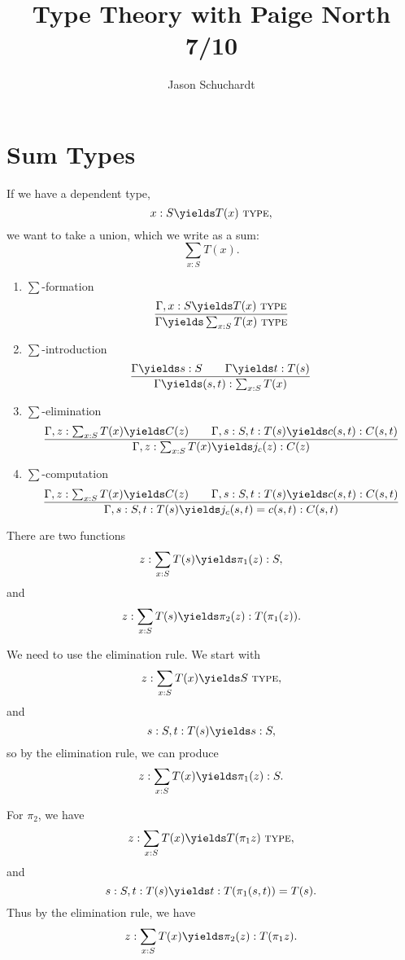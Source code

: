 \documentclass{article}
\title{Type Theory with Paige North 7/10}
\author{Jason Schuchardt}
\newcommand\TYPE{\text{ \scshape{type}}}
\begin{document}
\maketitle

\section{Sum Types}

If we have a dependent type,
\[ x:S\yields T(x)\TYPE,\]
we want to take a union, which we write 
as a sum:
\[\sum_{x:S} T(x).\]

\begin{enumerate}
    \item $\sum$-formation
        \[ \frac{\Gamma,x:S\yields T(x)\TYPE}{
            \Gamma\yields \sum_{x:S}T(x)\TYPE
        }\]
    \item $\sum$-introduction
        \[
            \frac{\Gamma\yields s:S\qquad \Gamma \yields t:T(s)}
            {
                \Gamma \yields (s,t) : \sum_{x:S}T(x)
            }
        \]
    \item $\sum$-elimination
        \[
            \frac{
                \Gamma,z:\sum_{x:S}T(x)\yields C(z)
                \qquad
                \Gamma,s:S,t:T(s) \yields c(s,t) : C(s,t)
            }{
                \Gamma,z:\sum_{x:S}T(x)\yields j_c(z):C(z)
            }
        \]
    \item $\sum$-computation
        \[
            \frac{
                \Gamma,z:\sum_{x:S}T(x)\yields C(z)
                \qquad
                \Gamma,s:S,t:T(s) \yields c(s,t) : C(s,t)
            }{
                \Gamma,s:S,t:T(s)\yields j_c(s,t) = c(s,t) :C(s,t)
            }
        \]
\end{enumerate}

\begin{example}
    There are two functions
    \[ z: \sum_{x:S} T(s) \yields \pi_1(z) : S, \]
    and
    \[ z: \sum_{x:S} T(s) \yields \pi_2(z) : T(\pi_1(z)). \]

    We need to use the elimination rule.
    We start with 
    \[ z:\sum_{x:S} T(x) \yields S\TYPE, \]
    and 
    \[ s:S, t:T(s) \yields s:S,\]
    so by the elimination rule, we can produce
    \[ z:\sum_{x:S}T(x)\yields \pi_1(z) :S. \]

    For $\pi_2$, we have 
    \[ z:\sum_{x:S}T(x) \yields T(\pi_1z)\TYPE,\]
    and 
    \[ s:S,t:T(s)\yields t:T(\pi_1(s,t))=T(s).\]
    Thus by the elimination rule, we have 
    \[ z:\sum_{x:S}T(x)\yields \pi_2(z):T(\pi_1 z). \]
\end{example}
\end{document}
